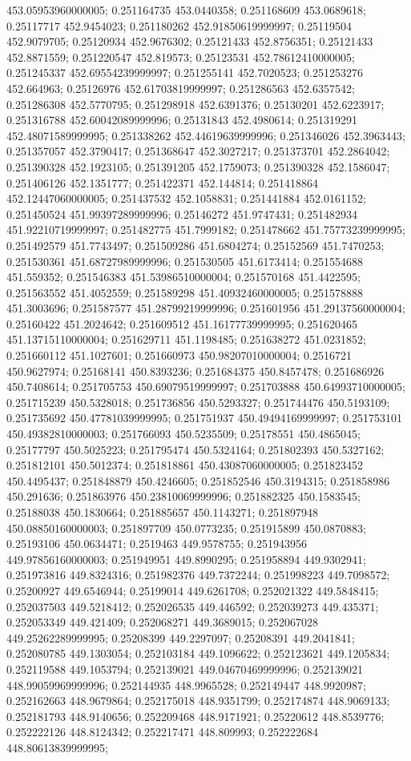 453.05953960000005; 0.251164735 453.0440358; 0.251168609 453.0689618; 0.25117717 452.9454023; 0.251180262 452.91850619999997; 0.25119504 452.9079705; 0.25120934 452.9676302; 0.25121433 452.8756351; 0.25121433 452.8871559; 0.251220547 452.819573; 0.25123531 452.78612410000005; 0.251245337 452.69554239999997; 0.251255141 452.7020523; 0.251253276 452.664963; 0.25126976 452.61703819999997; 0.251286563 452.6357542; 0.251286308 452.5770795; 0.251298918 452.6391376; 0.25130201 452.6223917; 0.251316788 452.60042089999996; 0.25131843 452.4980614; 0.251319291 452.48071589999995; 0.251338262 452.44619639999996; 0.251346026 452.3963443; 0.251357057 452.3790417; 0.251368647 452.3027217; 0.251373701 452.2864042; 0.251390328 452.1923105; 0.251391205 452.1759073; 0.251390328 452.1586047; 0.251406126 452.1351777; 0.251422371 452.144814; 0.251418864 452.12447060000005; 0.251437532 452.1058831; 0.251441884 452.0161152; 0.251450524 451.99397289999996; 0.25146272 451.9747431; 0.251482934 451.92210719999997; 0.251482775 451.7999182; 0.251478662 451.75773239999995; 0.251492579 451.7743497; 0.251509286 451.6804274; 0.25152569 451.7470253; 0.251530361 451.68727989999996; 0.251530505 451.6173414; 0.251554688 451.559352; 0.251546383 451.53986510000004; 0.251570168 451.4422595; 0.251563552 451.4052559; 0.251589298 451.40932460000005; 0.251578888 451.3003696; 0.251587577 451.28799219999996; 0.251601956 451.29137560000004; 0.25160422 451.2024642; 0.251609512 451.16177739999995; 0.251620465 451.13715110000004; 0.251629711 451.1198485; 0.251638272 451.0231852; 0.251660112 451.1027601; 0.251660973 450.98207010000004; 0.2516721 450.9627974; 0.25168141 450.8393236; 0.251684375 450.8457478; 0.251686926 450.7408614; 0.251705753 450.69079519999997; 0.251703888 450.64993710000005; 0.251715239 450.5328018; 0.251736856 450.5293327; 0.251744476 450.5193109; 0.251735692 450.47781039999995; 0.251751937 450.49494169999997; 0.251753101 450.49382810000003; 0.251766093 450.5235509; 0.25178551 450.4865045; 0.25177797 450.5025223; 0.251795474 450.5324164; 0.251802393 450.5327162; 0.251812101 450.5012374; 0.251818861 450.43087060000005; 0.251823452 450.4495437; 0.251848879 450.4246605; 0.251852546 450.3194315; 0.251858986 450.291636; 0.251863976 450.23810069999996; 0.251882325 450.1583545; 0.25188038 450.1830664; 0.251885657 450.1143271; 0.251897948 450.08850160000003; 0.251897709 450.0773235; 0.251915899 450.0870883; 0.25193106 450.0634471; 0.2519463 449.9578755; 0.251943956 449.97856160000003; 0.251949951 449.8990295; 0.251958894 449.9302941; 0.251973816 449.8324316; 0.251982376 449.7372244; 0.251998223 449.7098572; 0.25200927 449.6546944; 0.25199014 449.6261708; 0.252021322 449.5848415; 0.252037503 449.5218412; 0.252026535 449.446592; 0.252039273 449.435371; 0.252053349 449.421409; 0.252068271 449.3689015; 0.252067028 449.25262289999995; 0.25208399 449.2297097; 0.25208391 449.2041841; 0.252080785 449.1303054; 0.252103184 449.1096622; 0.252123621 449.1205834; 0.252119588 449.1053794; 0.252139021 449.04670469999996; 0.252139021 448.99059969999996; 0.252144935 448.9965528; 0.252149447 448.9920987; 0.252162663 448.9679864; 0.252175018 448.9351799; 0.252174874 448.9069133; 0.252181793 448.9140656; 0.252209468 448.9171921; 0.25220612 448.8539776; 0.252222126 448.8124342; 0.252217471 448.809993; 0.252222684 448.80613839999995; 